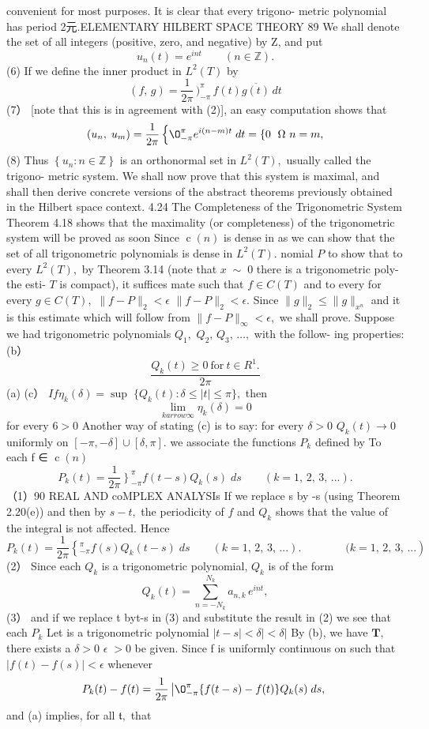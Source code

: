 convenient for most purposes. It is clear that every trigono- metric polynomial has period 2元.ELEMENTARY HILBERT SPACE THEORY 89 We shall denote the set of all integers (positive, zero, and negative) by Z, and put $$ u_{n}(t)=e^{i n t}\quad\quad(n\in\mathbb{Z}). $$ (6) If we define the inner product in $L^{2}(T)$ by $$ (f,\,g)={\frac{1}{2\pi}}\,\biggr)_{-\pi}^{\pi}\,f(t){\overline{{g(t)}}}\,d t $$ (7） [note that this is in agreement with (2)], an easy computation shows that $$ (u_{n},\;u_{m})=\frac{1}{2\pi}\left\{\O_{-\pi}^{\pi}e^{i(n-m)t}\;d t= \{0\right.\mathrm{~\if~}n=m, $$ (8) Thus $\left\{u_{n}\colon n\in\mathbb{Z}\right\}$ is an orthonormal set in $L^{2}(T),$ usually called the trigono- metric system. We shall now prove that this system is maximal, and shall then derive concrete versions of the abstract theorems previously obtained in the Hilbert space context. 4.24 The Completeness of the Trigonometric System Theorem 4.18 shows that the maximality (or completeness) of the trigonometric system will be proved as soon Since $\operatorname{c}(n)$ is dense in as we can show that the set of all trigonometric polynomials is dense in $L^{2}(T).$ nomial ${\mathbf{}}P$ to show that to every $L^{2}(T),$ by Theorem 3.14 (note that $\scriptstyle x\;{\sim}\;0$ there is a trigonometric poly- the esti- ${\mathbf{}}T$ is compact), it suffices mate such that $f\in C(T)$ and to every for every $g\in C(T),$ $\|f-P\|_{2}<\epsilon$ $\|f-P\|_{2}<\epsilon.$ Since $\|g\|_{2}\leq\|g\|_{x^{n}}$ and it is this estimate which will follow from $\|f-P\|_{\infty}<\epsilon,$ we shall prove. Suppose we had trigonometric polynomials $Q_{1},$ $Q_{2},\,Q_{3},\,\ldots,$ with the follow- ing properties: (b） $$ {\frac{Q_{k}(t)\geq0~{\mathrm{for~}}t\in R^{1}.}{2\pi}} $$ (a) (c） $I f\eta_{k}(\delta)=\operatorname*{sup}\;\{Q_{k}(t)\colon\delta\leq|t|\leq\pi\},$ then $$ \operatorname*{lim}_{k arrow\infty}\eta_{k}(\delta)=0 $$ for every $\scriptstyle{6>0}$ Another way of stating (c) is to say: for every $\delta>0$ $Q_{k}(t)\to0$ uniformly on $[-\pi,-\delta]\cup[\delta,\pi].$ we associate the functions $\mathbf{}P_{k}$ defined by To each f ∈ $\operatorname{c}(n)$ $$ P_{k}(t)=\frac{1}{2\pi}\left.\right\}_{-\pi}^{\pi}f(t-s)Q_{k}(s)\;d s\qquad(k=1,\,2,\,3,\,...). $$ （1）90 REAL AND coMPLEX ANALYSIs If we replace s by -s (using Theorem 2.20(e)) and then by $s-t,$ the periodicity of $\boldsymbol{\mathit{f}}$ and $Q_{k}$ shows that the value of the integral is not affected. Hence $$ P_{k}(t)=\frac{1}{2\pi}\left\{_{-\pi}^{\pi}f(s)Q_{k}(t-s)\;d s\qquad(k=1,\,2,\,3,\,...).\qquad\qquad(k=1,\,2,\,3,\,...\right) $$ (2） Since each $Q_{k}$ is a trigonometric polynomial, $Q_{k}$ is of the form $$ Q_{k}(t)=\sum_{n=-N_{k}}^{N_{k}}a_{n,k}\,e^{i n t}, $$ (3） and if we replace t byt-s in (3) and substitute the result in (2) we see that each $P_{k}$ Let is a trigonometric polynomial $|t-s|<\delta|<\delta|$ By (b), we have ${\boldsymbol{T}},$ there exists a $\delta>0$ $\scriptstyle\epsilon\;>0$ be given. Since f is uniformly continuous on such that $|f(t)-f(s)|<\epsilon$ whenever $$ P_{k}(t)-f(t)={\frac{1}{2\pi}}\left|\O_{-\pi}^{\pi}\{f(t-s)-f(t)\}Q_{k}(s)\;d s,\nonumber\right. $$ and (a) implies, for all ${\mathfrak{t}},$ that $$ 